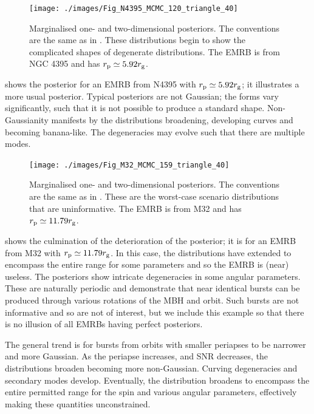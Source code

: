 \begin{figure}%
\centering
\vspace{0.5\baselineskip}
   \texttt{[image: ./images/Fig\_N4395\_MCMC\_120\_triangle\_40]}
\caption{Marginalised one- and two-dimensional posteriors. The conventions are the same as in . These distributions begin to show the complicated shapes of degenerate distributions. The EMRB is from NGC 4395 and has $r_\mathrm{p} \simeq 5.92 r_\mathrm{g}$.}
\label{fig:MCMC-b}
\end{figure}
 shows the posterior for an EMRB from N4395 with $r_\mathrm{p} \simeq 5.92 r_\mathrm{g}$; it illustrates a more usual posterior. Typical posteriors are not Gaussian; the forms vary significantly, such that it is not possible to produce a standard shape. Non-Gaussianity manifests by the distributions broadening, developing curves and becoming banana-like. The degeneracies may evolve such that there are multiple modes.

\begin{figure}%
\centering
	\vspace{0.5\baselineskip}
   \texttt{[image: ./images/Fig\_M32\_MCMC\_159\_triangle\_40]}
\caption{Marginalised one- and two-dimensional posteriors. The conventions are the same as in . These are the worst-case scenario distributions that are uninformative. The EMRB is from M32 and has $r_\mathrm{p} \simeq 11.79 r_\mathrm{g}$.}
\label{fig:MCMC-c}
\end{figure}
 shows the culmination of the deterioration of the posterior; it is for an EMRB from M32 with $r_\mathrm{p} \simeq 11.79 r_\mathrm{g}$. In this case, the distributions have extended to encompass the entire range for some parameters and so the EMRB is (near) useless. The posteriors show intricate degeneracies in some angular parameters. These are naturally periodic and demonstrate that near identical bursts can be produced through various rotations of the MBH and orbit. Such bursts are not informative and so are not of interest, but we include this example so that there is no illusion of all EMRBs having perfect posteriors.

The general trend is for bursts from orbits with smaller periapses to be narrower and more Gaussian. As the periapse increases, and SNR decreases, the distributions broaden becoming more non-Gaussian. Curving degeneracies and secondary modes develop. Eventually, the distribution broadens to encompass the entire permitted range for the spin and various angular parameters, effectively making these quantities unconstrained.

